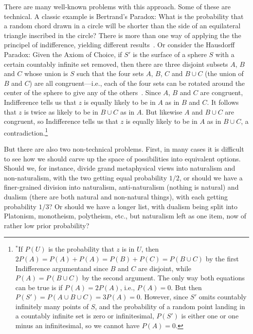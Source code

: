 There are many well-known problems with this approach. Some of these are technical. A classic
example is Bertrand's Paradox: What is the probability that a random chord drawn in a circle will
be shorter than the side of an equilateral triangle inscribed in the circle? There is more than one
way of applying the the principel of indifference, yielding different results~\parencite{Shackel2007}.
Or consider the Hausdorff Paradox: Given the Axiom of Choice, if $S'$ is the surface of a sphere $S$ with a
certain countably infinite set removed, then there are three disjoint subsets $A$, $B$ and $C$ whose
union is $S$ such that the four sets $A$, $B$, $C$ and $B\cup C$ (the union of $B$ and $C$) are all 
congruent---i.e., each of the four sets can be rotated around the center of the sphere to give any of
the others~\parencite{Hausdorff}. Since $A$, $B$ and $C$ are congruent, Indifference tells us 
that $z$ is equally likely to be in $A$ as in $B$ and $C$. It follows that $z$ is twice as likely 
to be in $B\cup C$ as in $A$.  But likewise $A$ and $B\cup C$ are congruent, so
Indifference tells us that $z$ is equally likely to be in $A$ as in $B\cup C$, a contradiction.\footnote{$^*$If
$P(U)$ is the probability that $z$ is in $U$, then $2P(A)=P(A)+P(A)=P(B)+P(C)=P(B\cup C)$ by the first Indifference argumentand since $B$ and $C$ are disjoint, while $P(A)=P(B\cup C)$ by the second argument. The only way both
equations can be true is if $P(A)=2P(A)$, i.e., $P(A)=0$. But then $P(S')=P(A\cup B\cup C)=3P(A)=0$. However,
since $S'$ omits countably infinitely many points of $S$, and the probability of a random point landing in a 
countably infinite set is zero or infinitesimal, $P(S')$ is either one or one minus an infinitesimal, so we
cannot have $P(A)=0$.}

But there are also two non-technical problems. First, in many cases it is
difficult to see how we should carve up the space of possibilities into equivalent options. Should we,
for instance, divide grand metaphysical views  into naturalism and non-naturalism, with the two getting
equal probability $1/2$, or should we have a finer-grained division into naturalism, anti-naturalism
(nothing is natural) and dualism (there are both natural and non-natural things), with each getting 
probability $1/3$? Or should we have a longer list, with dualism being split into Platonism, monotheism,
polytheism, etc., but naturalism left as one item, now of rather low prior probability? 

